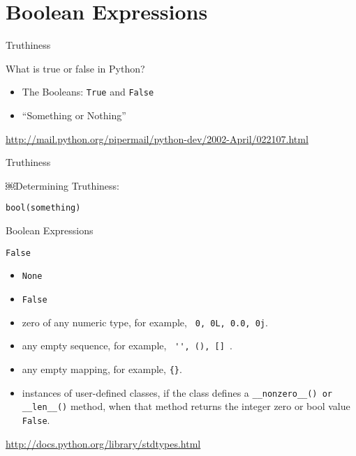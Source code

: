 \documentclass{beamer}
\begin{document}
\section{Boolean Expressions}

\begin{frame}[fragile]{Truthiness}

{\Large What is true or false in Python?}

\begin{itemize}
  \item The Booleans: \verb+True+ and \verb+False+
  \item ``Something or Nothing''
\end{itemize}

{\small \url{http://mail.python.org/pipermail/python-dev/2002-April/022107.html} }

\end{frame}

\begin{frame}[fragile]{Truthiness}

{\Large ￼Determining Truthiness:}

\vfill
{\Large \verb+bool(something)+ }

\vfill


\end{frame}

\begin{frame}[fragile]{Boolean Expressions}

{\Large \verb+False+ }

\begin{itemize}
  \item \verb+None+
  \item \verb+False+
  \item zero of any numeric type, for example, \verb+ 0, 0L, 0.0, 0j+.
  \item any empty sequence, for example, \verb+ '', (), [] +.
  \item any empty mapping, for example, \verb+{}+.
  \item instances of user-defined classes, if the class defines a
        \verb+__nonzero__() or __len__()+ method, when that method
        returns the integer zero or bool value \verb+False+.
\end{itemize}

\url{http://docs.python.org/library/stdtypes.html}

\end{frame}
\end{document}
